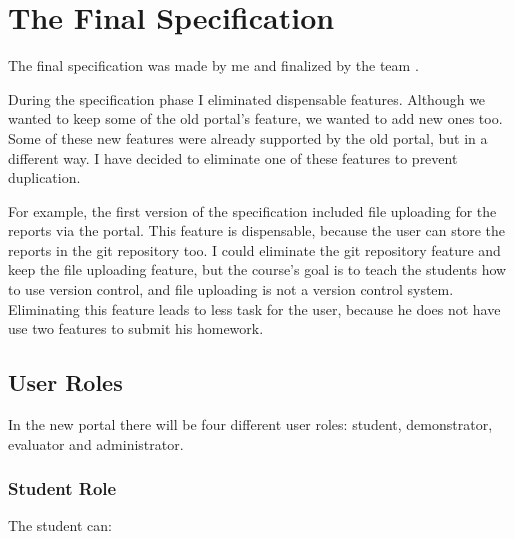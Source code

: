 \section{The Final Specification} \label{final-spec}
The final specification was made by me and finalized by the team .

During the specification phase I eliminated dispensable features. Although we wanted to keep some of the old portal's feature, we wanted to add new ones too. Some of these new features were already supported by the old portal, but in a different way. I have decided to eliminate one of these features to prevent duplication.

For example, the first version of the specification included file uploading for the reports via the portal. This feature is dispensable, because the user can store the reports in the git repository too. I could eliminate the git repository feature and keep the file uploading feature, but the course's goal is to teach the students how to use version control, and file uploading is not a version control system. Eliminating this feature leads to less task for the user, because he does not have use two features to submit his homework.

\subsection{User Roles}
\label{user-roles}
In the new portal there will be four different user roles: student, demonstrator, evaluator and administrator. 

\subsubsection{Student Role}

The student can:

